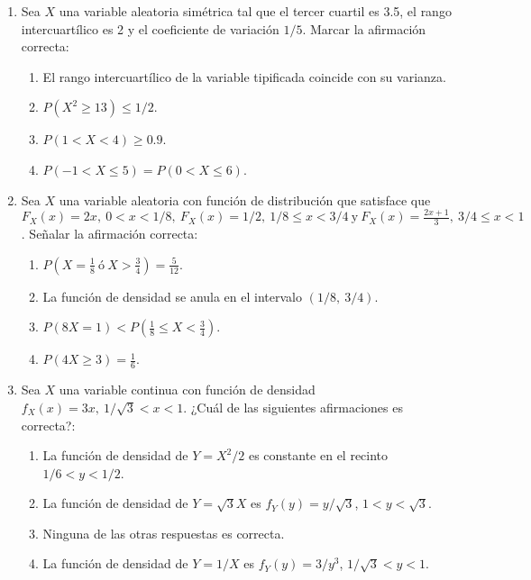 \documentclass[fleqn]{article}
\begin{document}
\begin{enumerate}
  \item Sea $X$ una variable aleatoria simétrica tal que el tercer cuartil es 3.5, el rango intercuartílico es 2 y el coeficiente de variación $1/5$. Marcar la afirmación correcta:

        \begin{enumerate}
          \item El rango intercuartílico de la variable tipificada coincide con su varianza.
          \item $P(X^2 \ge 13) \le 1/2$.
          \item $P(1 < X < 4) \ge 0.9$.
          \item $P(-1 < X \le 5) = P(0 < X \le 6)$.
        \end{enumerate}

  \item Sea $X$ una variable aleatoria con función de distribución que satisface que $F_X(x) = 2x,\ 0 < x < 1/8,\ F_X(x) = 1/2,\ 1/8 \le x < 3/4\ \text{y}\ F_X(x) = \frac{2x + 1}{3},\ 3/4 \le x < 1$. Señalar la afirmación correcta:

        \begin{enumerate}
          \item $P\left(X = \frac{1}{8}\ \text{ó}\ X > \frac{3}{4}\right) = \frac{5}{12}$.
          \item La función de densidad se anula en el intervalo $(1/8,\ 3/4)$.
          \item $P(8X = 1) < P\left(\frac{1}{8} \le X < \frac{3}{4}\right)$.
          \item $P(4X \ge 3) = \frac{1}{6}$.
        \end{enumerate}

  \item Sea $X$ una variable continua con función de densidad $f_X(x) = 3x,\ 1/\sqrt{3} < x < 1$. ¿Cuál de las siguientes afirmaciones es correcta?:

        \begin{enumerate}
          \item La función de densidad de $Y = X^2/2$ es constante en el recinto $1/6 < y < 1/2$.
          \item La función de densidad de $Y = \sqrt{3}X$ es $f_Y(y) = y/\sqrt{3}$, $1 < y < \sqrt{3}$.
          \item Ninguna de las otras respuestas es correcta.
          \item La función de densidad de $Y = 1/X$ es $f_Y(y) = 3/y^3$, $1/\sqrt{3} < y < 1$.
        \end{enumerate}


\end{enumerate}
\end{document}
